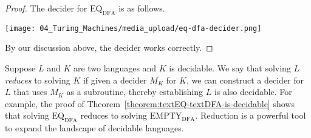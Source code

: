 \begin{flex}
\begin{proof}
The decider for $\mathrm{EQ}_\mathrm{DFA}$ is as follows.
\begin{center}
    \texttt{[image: 04\_Turing\_Machines/media\_upload/eq-dfa-decider.png]}
\end{center}

By our discussion above, the decider works correctly.
\end{proof}
\end{flex}


\begin{important} \label{important:Decidability-through-reductions}
Suppose $L$ and $K$ are two languages and $K$ is decidable. We say that solving $L$ \emph{reduces} to solving $K$ if given a decider $M_K$ for $K$, we can construct a decider for $L$ that uses $M_K$ as a subroutine, thereby establishing $L$ is also decidable. For example, the proof of Theorem~\ref{theorem:textEQ-textDFA-is-decidable} shows that solving $\mathrm{EQ}_\mathrm{DFA}$ reduces to solving $\mathrm{EMPTY}_\mathrm{DFA}$. Reduction is a powerful tool to expand the landscape of decidable languages.
\end{important}


